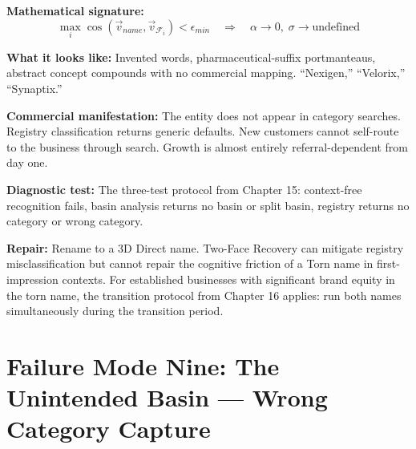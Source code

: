 \documentclass[12pt, openany]{book}
\theoremstyle{thmstyle}
\theoremstyle{defstyle}
\begin{document}
\begin{failbox}
\textbf{Mathematical signature:}
\[
\max_i \cos(\vec{v}_{name}, \vec{v}_{\mathcal{F}_i}) < \epsilon_{min} \quad \Rightarrow \quad \alpha \to 0, \;\sigma \to \text{undefined}
\]

\textbf{What it looks like:} Invented words, pharmaceutical-suffix portmanteaus, abstract concept compounds with no commercial mapping. ``Nexigen,'' ``Velorix,'' ``Synaptix.''

\textbf{Commercial manifestation:} The entity does not appear in category searches. Registry classification returns generic defaults. New customers cannot self-route to the business through search. Growth is almost entirely referral-dependent from day one.

\textbf{Diagnostic test:} The three-test protocol from Chapter 15: context-free recognition fails, basin analysis returns no basin or split basin, registry returns no category or wrong category.

\textbf{Repair:} Rename to a 3D Direct name. Two-Face Recovery can mitigate registry misclassification but cannot repair the cognitive friction of a Torn name in first-impression contexts. For established businesses with significant brand equity in the torn name, the transition protocol from Chapter 16 applies: run both names simultaneously during the transition period.
\end{failbox}

\section{Failure Mode Nine: The Unintended Basin --- Wrong Category Capture}
\end{document}
